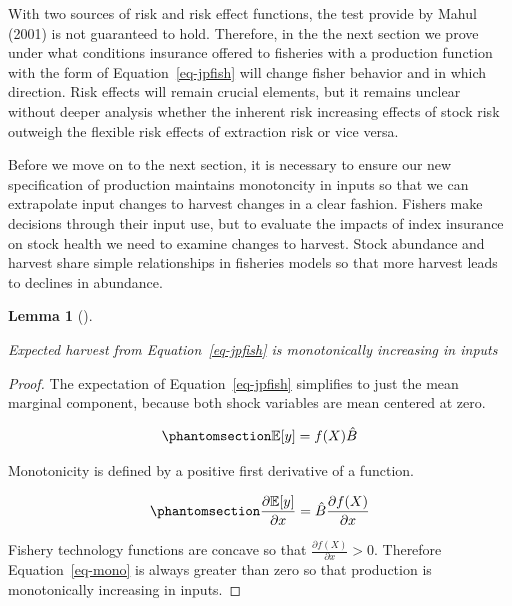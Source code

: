 \documentclass[
  letterpaper,
  DIV=11,
  numbers=noendperiod]{scrartcl}
\theoremstyle{plain}
\newtheorem{lemma}{Lemma}[section]
\theoremstyle{plain}
\theoremstyle{remark}
\begin{document}
With two sources of risk and risk effect functions, the test provide by
Mahul (2001) is not guaranteed to hold. Therefore, in the the next
section we prove under what conditions insurance offered to fisheries
with a production function with the form of Equation~\ref{eq-jpfish}
will change fisher behavior and in which direction. Risk effects will
remain crucial elements, but it remains unclear without deeper analysis
whether the inherent risk increasing effects of stock risk outweigh the
flexible risk effects of extraction risk or vice versa.

Before we move on to the next section, it is necessary to ensure our new
specification of production maintains monotoncity in inputs so that we
can extrapolate input changes to harvest changes in a clear fashion.
Fishers make decisions through their input use, but to evaluate the
impacts of index insurance on stock health we need to examine changes to
harvest. Stock abundance and harvest share simple relationships in
fisheries models so that more harvest leads to declines in abundance.

\begin{lemma}[]\protect\hypertarget{lem-har}{}\label{lem-har}

Expected harvest from Equation~\ref{eq-jpfish} is monotonically
increasing in inputs

\end{lemma}

\begin{proof}
The expectation of Equation~\ref{eq-jpfish} simplifies to just the mean
marginal component, because both shock variables are mean centered at
zero.

\begin{equation}\phantomsection\label{eq-expjp}{
\mathbb{E}[y]=f(X)\hat{B}
}\end{equation}

Monotonicity is defined by a positive first derivative of a function.

\begin{equation}\phantomsection\label{eq-mono}{
\frac{\partial \mathbb{E}[y]}{\partial x}=\hat{B}\frac{\partial f(X)}{\partial x}
}\end{equation}

Fishery technology functions are concave so that
\(\frac{\partial f(X)}{\partial x}>0\). Therefore Equation~\ref{eq-mono}
is always greater than zero so that production is monotonically
increasing in inputs.
\end{proof}
\end{document}
